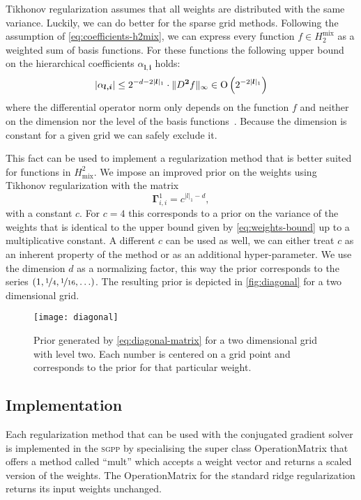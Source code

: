Tikhonov regularization assumes that all weights are distributed with the same variance.
Luckily, we can do better for the sparse grid methods.
Following the assumption of \cref{eq:coefficients-h2mix}, we can express every
function \(f \in H_2^{\text{mix}}\) as a weighted sum of basis functions.
For these functions the following upper bound on the hierarchical coefficients \(\alpha_{\bm{l, i}}\) holds:
\begin{equation}\label{eq:weights-bound}
  \vert \alpha_{\bm{l, i}} \vert \leq 2^{-d -2 \vert \bm{l} \vert_1} \cdot \Vert D^{\bm{2}} f \Vert_{\infty} 
                              \in \operatorname{O} \left( 2^{-2 \vert \bm{l} \vert_1} \right)
\end{equation}
where the differential operator norm only depends on the function \(f\) and neither on the dimension nor the level of the basis functions~\cite{bungartzSparse}.
Because the dimension is constant for a given grid we can safely exclude it.

This fact can be used to implement a regularization method that is better suited for functions in \(H^2_\text{mix}\).
We impose an improved prior on the weights using Tikhonov regularization
with the matrix
\begin{equation}\label{eq:diagonal-matrix}
\bm{\Gamma}_{i,i}^{1} = c^{\vert l \vert_1 - d},
\end{equation}
with a constant \(c\).
For \(c = 4\) this corresponds to a prior on the variance of the weights that is identical to the upper bound given by \cref{eq:weights-bound} up to a multiplicative constant.
A different \(c\) can be used as well, we can either treat \(c\) as an inherent property of the method or as an additional hyper-parameter.
We use the dimension \(d\) as a normalizing factor, this way the prior
corresponds to the series \((1, \nicefrac{1}{4}, \nicefrac{1}{16}, \ldots)\).
The resulting prior is depicted in \vref{fig:diagonal} for a two dimensional grid.

\begin{figure}[htb]
  \centering
  \texttt{[image: diagonal]}
\caption[Diagonal Regularization]{
Prior generated by \cref{eq:diagonal-matrix} for a two dimensional grid with level two.
Each number is centered on a grid point and
corresponds to the prior for that particular weight.
}\label{fig:diagonal}
\end{figure}

\FloatBarrier{}

\subsection{Implementation}
Each regularization method that can be used with the conjugated gradient solver
is implemented in the \textsc{sgpp} by specialising the super class
OperationMatrix that offers a method called ``mult'' which accepts a weight
vector and returns a scaled version of the weights.
The OperationMatrix for the standard ridge regularization returns its input
weights unchanged.

